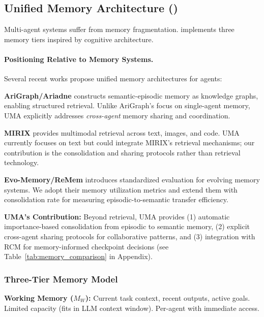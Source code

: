 \documentclass{article}
\theoremstyle{plain}
\theoremstyle{definition}
\theoremstyle{remark}
\begin{document}
\subsection{Unified Memory Architecture (\uma{})}
\label{sec:uma}

Multi-agent systems suffer from memory fragmentation. \uma{} implements three memory tiers inspired by cognitive architecture.

\paragraph{Positioning Relative to Memory Systems.}
Several recent works propose unified memory architectures for agents:

\textbf{AriGraph/Ariadne} \citep{anokhin2024arigraph} constructs semantic-episodic memory as knowledge graphs, enabling structured retrieval. Unlike AriGraph's focus on single-agent memory, UMA explicitly addresses \emph{cross-agent} memory sharing and coordination.

\textbf{MIRIX} \citep{wang2024mirix} provides multimodal retrieval across text, images, and code. UMA currently focuses on text but could integrate MIRIX's retrieval mechanisms; our contribution is the consolidation and sharing protocols rather than retrieval technology.

\textbf{Evo-Memory/ReMem} \citep{liu2024evomemory} introduces standardized evaluation for evolving memory systems. We adopt their memory utilization metrics and extend them with consolidation rate for measuring episodic-to-semantic transfer efficiency.

\textbf{UMA's Contribution:} Beyond retrieval, UMA provides (1) automatic importance-based consolidation from episodic to semantic memory, (2) explicit cross-agent sharing protocols for collaborative patterns, and (3) integration with RCM for memory-informed checkpoint decisions (see Table~\ref{tab:memory_comparison} in Appendix).

\subsubsection{Three-Tier Memory Model}

\textbf{Working Memory ($M_W$):} Current task context, recent outputs, active goals. Limited capacity (fits in LLM context window). Per-agent with immediate access.
\end{document}
